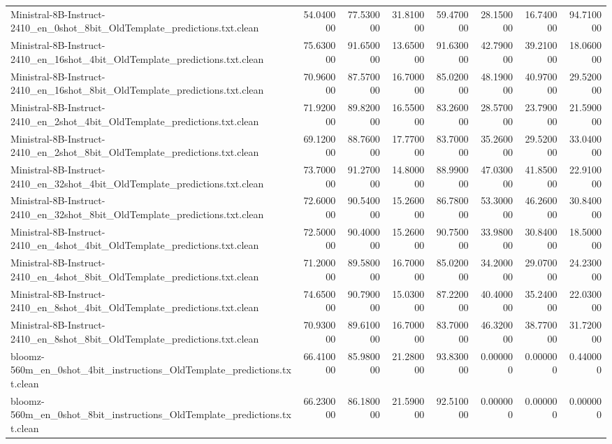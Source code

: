 \begin{tabular}{lrrrrrrr}
Ministral-8B-Instruct-2410_en_0shot_8bit_OldTemplate_predictions.txt.clean & 54.040000 & 77.530000 & 31.810000 & 59.470000 & 28.150000 & 16.740000 & 94.710000 \\
Ministral-8B-Instruct-2410_en_16shot_4bit_OldTemplate_predictions.txt.clean & 75.630000 & 91.650000 & 13.650000 & 91.630000 & 42.790000 & 39.210000 & 18.060000 \\
Ministral-8B-Instruct-2410_en_16shot_8bit_OldTemplate_predictions.txt.clean & 70.960000 & 87.570000 & 16.700000 & 85.020000 & 48.190000 & 40.970000 & 29.520000 \\
Ministral-8B-Instruct-2410_en_2shot_4bit_OldTemplate_predictions.txt.clean & 71.920000 & 89.820000 & 16.550000 & 83.260000 & 28.570000 & 23.790000 & 21.590000 \\
Ministral-8B-Instruct-2410_en_2shot_8bit_OldTemplate_predictions.txt.clean & 69.120000 & 88.760000 & 17.770000 & 83.700000 & 35.260000 & 29.520000 & 33.040000 \\
Ministral-8B-Instruct-2410_en_32shot_4bit_OldTemplate_predictions.txt.clean & 73.700000 & 91.270000 & 14.800000 & 88.990000 & 47.030000 & 41.850000 & 22.910000 \\
Ministral-8B-Instruct-2410_en_32shot_8bit_OldTemplate_predictions.txt.clean & 72.600000 & 90.540000 & 15.260000 & 86.780000 & 53.300000 & 46.260000 & 30.840000 \\
Ministral-8B-Instruct-2410_en_4shot_4bit_OldTemplate_predictions.txt.clean & 72.500000 & 90.400000 & 15.260000 & 90.750000 & 33.980000 & 30.840000 & 18.500000 \\
Ministral-8B-Instruct-2410_en_4shot_8bit_OldTemplate_predictions.txt.clean & 71.200000 & 89.580000 & 16.700000 & 85.020000 & 34.200000 & 29.070000 & 24.230000 \\
Ministral-8B-Instruct-2410_en_8shot_4bit_OldTemplate_predictions.txt.clean & 74.650000 & 90.790000 & 15.030000 & 87.220000 & 40.400000 & 35.240000 & 22.030000 \\
Ministral-8B-Instruct-2410_en_8shot_8bit_OldTemplate_predictions.txt.clean & 70.930000 & 89.610000 & 16.700000 & 83.700000 & 46.320000 & 38.770000 & 31.720000 \\
bloomz-560m_en_0shot_4bit_instructions_OldTemplate_predictions.txt.clean & 66.410000 & 85.980000 & 21.280000 & 93.830000 & 0.000000 & 0.000000 & 0.440000 \\
bloomz-560m_en_0shot_8bit_instructions_OldTemplate_predictions.txt.clean & 66.230000 & 86.180000 & 21.590000 & 92.510000 & 0.000000 & 0.000000 & 0.000000 \\

\end{tabular}

